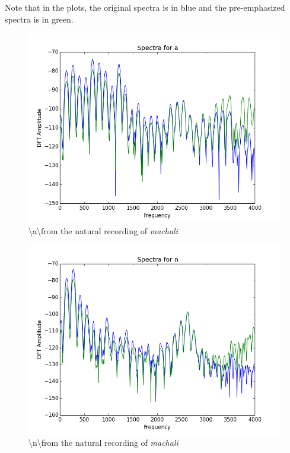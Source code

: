 \documentclass[a4paper]{article}
\begin{document}
Note that in the plots, the original spectra is in blue and the pre-emphasized spectra is in green. 



\begin{figure}[h!]
    \includegraphics[width=\linewidth]{./images/spectra_a.png}
    \caption{ \textbackslash a\textbackslash from the natural recording of \textit{machali}}
    \label{fig:1}
\end{figure}


\begin{figure}[h!]
    \includegraphics[width=\linewidth]{./images/spectra_n.png}
    \caption{ \textbackslash n\textbackslash from the natural recording of \textit{machali}}
    \label{fig:1}
\end{figure}
\end{document}
